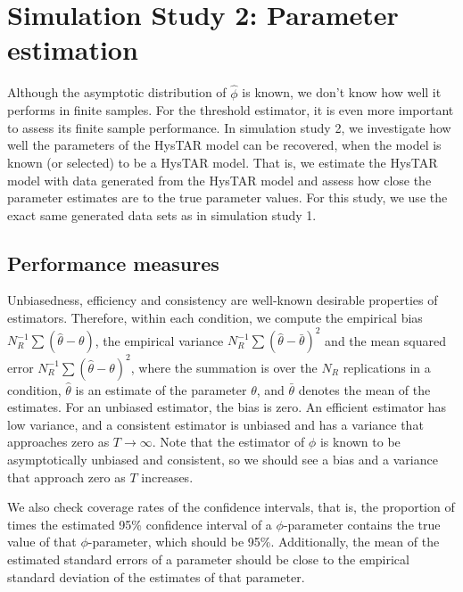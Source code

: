 \documentclass{article}
\begin{document}


\section{Simulation Study 2: Parameter estimation}
\label{sec:simulation_study_2}
Although the asymptotic distribution of $\hat{\phi}$ is known, we don't know how well it performs in finite samples.
For the threshold estimator, it is even more important to assess its finite sample performance.
In simulation study 2, we investigate how well the parameters of the HysTAR model can be recovered, when the model is known (or selected) to be a HysTAR model. That is, we estimate the HysTAR model with data generated from the HysTAR model and assess how close the parameter estimates are to the true parameter values.
For this study, we use the exact same generated data sets as in simulation study 1.

\subsection{Performance measures}
Unbiasedness, efficiency and consistency are well-known desirable properties of estimators. Therefore, within each condition, we compute the empirical bias $N_R^{-1} \sum (\hat{\theta} - \theta)$, the empirical variance $N_R^{-1} \sum (\hat{\theta} - \bar{\theta})^2$ and the mean squared error $N_R^{-1} \sum (\hat{\theta} - \theta)^2$, where the summation is over the $N_R$ replications in a condition, $\hat{\theta}$ is an estimate of the parameter $\theta$, and $\bar{\theta}$ denotes the mean of the estimates.
For an unbiased estimator, the bias is zero.
An efficient estimator has low variance, and a consistent estimator is unbiased and has a variance that approaches zero as $T \rightarrow \infty$.
Note that the estimator of $\phi$ is known to be asymptotically unbiased and consistent, so we should see a bias and a variance that approach zero as $T$ increases.

We also check coverage rates of the confidence intervals, that is, the proportion of times the estimated 95\% confidence interval of a $\phi$-parameter contains the true value of that $\phi$-parameter, which should be 95\%. Additionally, the mean of the estimated standard errors of a parameter should be close to the empirical standard deviation of the estimates of that parameter.
\end{document}
